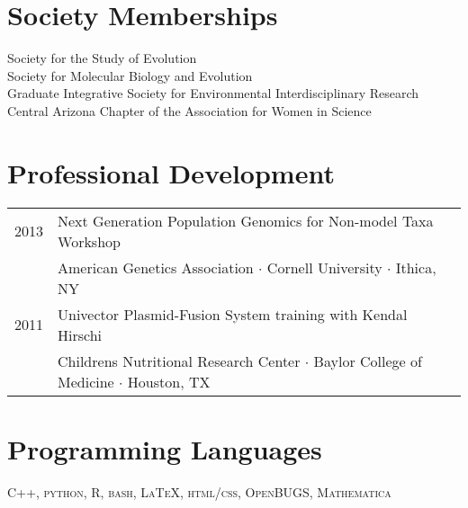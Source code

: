 \documentclass[11pt]{article}
\begin{document}
\section*{Society Memberships}
Society for the Study of Evolution\\
Society for Molecular Biology and Evolution\\
Graduate Integrative Society for Environmental Interdisciplinary Research\\
Central Arizona Chapter of the Association for Women in Science
\section*{Professional Development}
\begin{tabularx}{\linewidth}{l X}
2013&Next Generation Population Genomics for Non-model Taxa Workshop\\
&American Genetics Association $\cdotp$ Cornell University $\cdotp$ Ithica, NY\\

2011& Univector Plasmid-Fusion System training with Kendal Hirschi\\
&Childrens Nutritional Research Center $\cdotp$ Baylor College of Medicine $\cdotp$ Houston, TX\\

\end{tabularx}
\section*{Programming Languages}
\textsc{C++, python, R, bash, \LaTeX, html/css, OpenBUGS, Mathematica}
\end{document}
